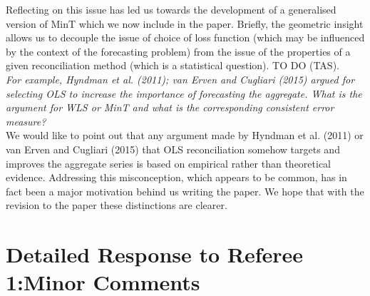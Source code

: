 \documentclass[a4paper,11pt]{article}
\begin{document}
\begin{enumerate}
	    Reflecting on this issue has led us towards the development of a generalised version of MinT which we now include in the paper.  Briefly, the geometric insight allows us to decouple the issue of choice of loss function (which may be influenced by the context of the forecasting problem) from the issue of the properties of a given reconciliation method (which is a statistical question).  TO DO (TAS).\\
		
		\textit{For example, Hyndman et al. (2011); van Erven and
		Cugliari (2015) argued for selecting OLS to increase the importance of
		forecasting the aggregate. What is the argument for WLS or MinT and
		what is the corresponding consistent error measure?}\\
	    
	    We would like to point out that any argument made by Hyndman et al. (2011) or van Erven and Cugliari (2015) that OLS reconciliation somehow targets and improves the aggregate series is based on empirical rather than theoretical evidence.  Addressing this misconception, which appears to be common, has in fact been a major motivation behind us writing the paper.  We hope that with the revision to the paper these distinctions are clearer.\\
	    
	    \end{enumerate}
	    
	    \section*{Detailed Response to Referee 1:Minor Comments}
	    
\end{document}
